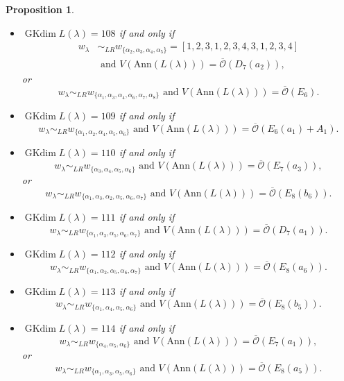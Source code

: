 \documentclass[reqno,12pt]{amsart}
\numberwithin{equation}{section}
\theoremstyle{plain}
\newtheorem{Prop}[Thm]{Proposition}
\theoremstyle{definition}
\newcommand{\lam}{\lambda}
\newcommand{\Ann}{\mathrm{Ann}}
\newcommand{\gkd}{\operatorname{GKdim}}
\begin{document}
\begin{Prop}
\begin{itemize}
      
\item[(28)] $\gkd L(\lambda)=108$ if and only if \begin{align*}
    w_{\lambda}&\sim_{LR}
w_{\{\alpha_2,\alpha_3,\alpha_4,\alpha_5\}}=[1, 2, 3, 1, 2, 3, 4, 3, 1, 2, 3, 4]\\
&\text{~and~} V(\Ann (L(\lam)))=\overline{\mathcal{O}}({D}_7(a_2)), 
\end{align*}
or $$w_{\lambda}\sim_{LR}
w_{\{\alpha_1,\alpha_3,\alpha_4,\alpha_6,\alpha_7,\alpha_8\}} 
 \text{~and~} V(\Ann (L(\lam)))=\overline{\mathcal{O}}({E}_6).$$
      
        \item[(29)] $\gkd L(\lambda)=109$ if and only if $$w_{\lambda}\sim_{LR}
        w_{\{\alpha_1,\alpha_2,\alpha_4,\alpha_5,\alpha_6\}} \text{~and~} V(\Ann (L(\lam)))=\overline{\mathcal{O}}({E}_6(a_1)+A_1).$$
       
        \item[(30)] $\gkd L(\lambda)=110$ if and only if $$w_{\lambda}\sim_{LR}w_{\{\alpha_3,\alpha_4,\alpha_5,\alpha_6\}}
       \text{~and~} V(\Ann (L(\lam)))=\overline{\mathcal{O}}({E}_7(a_3)),$$ or
$$w_{\lambda}\sim_{LR}
w_{\{\alpha_1,\alpha_3,\alpha_2,\alpha_5,\alpha_6,\alpha_7\}} 
 \text{~and~} V(\Ann (L(\lam)))=\overline{\mathcal{O}}({E}_8(b_6)).$$
 
  \item[(31)] $\gkd L(\lambda)=111$ if and only if $$w_{\lambda}\sim_{LR}w_{\{\alpha_1,\alpha_3,\alpha_5,\alpha_6,\alpha_7\}} \text{~and~} V(\Ann (L(\lam)))=\overline{\mathcal{O}}({D}_7(a_1)).$$
   
    \item[(32)] $\gkd L(\lambda)=112$ if and only if $$w_{\lambda}\sim_{LR}w_{\{\alpha_1,\alpha_2,\alpha_5,\alpha_6,\alpha_7\}}\text{~and~} V(\Ann (L(\lam)))=\overline{\mathcal{O}}({E}_8(a_6)).$$
      
        
        \item[(33)] $\gkd L(\lambda)=113$ if and only if $$w_{\lambda}\sim_{LR}w_{\{\alpha_1,\alpha_4,\alpha_5,\alpha_6\}}
        \text{~and~} V(\Ann (L(\lam)))=\overline{\mathcal{O}}({E}_8(b_5)).$$
      
       \item[(34)] $\gkd L(\lambda)=114$ if and only if $$w_{\lambda}\sim_{LR}w_{\{\alpha_4,\alpha_5,\alpha_6\}} \text{~and~} V(\Ann (L(\lam)))=\overline{\mathcal{O}}({E}_7(a_1)),$$ or $$w_{\lambda}\sim_{LR}w_{\{\alpha_1,\alpha_3,\alpha_5,\alpha_6\}} \text{~and~} V(\Ann (L(\lam)))=\overline{\mathcal{O}}({E}_8(a_5)).$$
        

\end{itemize}
\end{Prop}
\end{document}
